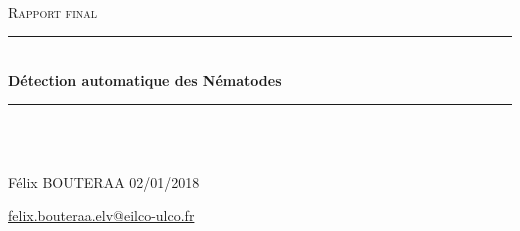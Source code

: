 \documentclass[12pt,a4paper]{article}
\newcommand{\HRule}{\rule{\linewidth}{0.5mm}}
\begin{document}
\begin{titlepage}
  \begin{sffamily}
  \begin{center}
\begin{figure}

\end{figure}

    \\[2.5cm]

    \textsc{\Large Rapport final}\\[1.5cm]

    \HRule \\[0.4cm]
    { \huge \bfseries Détection automatique des Nématodes \\[0.4cm] }
 \HRule \\[1.5cm]
 
 \\[8cm]


        \begin{flushleft}
	Félix BOUTERAA 02/01/2018
	\end{flushleft}  
    
    \begin{flushright}
\href{mailto:felix.bouteraa.elv@eilco-ulco.fr}{felix.bouteraa.elv@eilco-ulco.fr} 
\end{flushright}  

  \end{center}
  \end{sffamily}
\end{titlepage}

\newpage

\tableofcontents

\newpage
\end{document}
